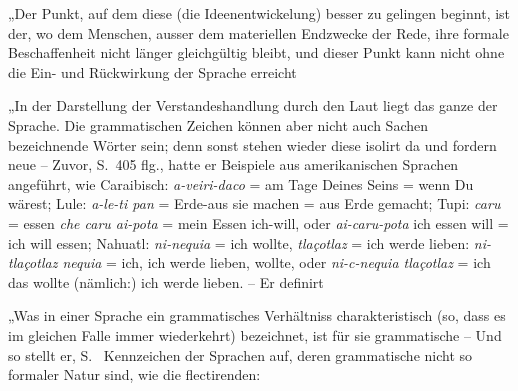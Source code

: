
 „Der Punkt, auf dem diese (die Ideenentwickelung) besser zu gelingen beginnt, ist der, wo dem Menschen, ausser dem materiellen Endzwecke der Rede, ihre formale Beschaffenheit nicht länger gleichgültig bleibt, und dieser Punkt kann nicht ohne die Ein- und Rückwirkung der Sprache erreicht 

 „In der Darstellung der Verstandeshandlung durch den Laut liegt das ganze  der Sprache. Die grammatischen Zeichen können aber nicht auch Sachen bezeichnende Wörter sein; denn sonst stehen wieder diese isolirt da und fordern neue   – Zuvor, S.~405 flg., hatte er Beispiele aus amerikanischen Sprachen angeführt, wie Caraibisch: \textit{a-veiri-daco} = am Tage Deines Seins \label{fp.320} = wenn Du wärest; Lule: \textit{a-le-ti pan} = Erde-aus sie machen = aus Erde gemacht; Tupi: \textit{caru} = essen  \textit{che caru ai-pota} = mein Essen ich-will, oder \textit{ai-caru-pota} \fed{=} ich essen will = ich will essen; Nahuatl: \textit{ni-nequia} = ich wollte, \textit{tlaçotlaz} = ich werde lieben: \textit{ni-tlaçotlaz nequia} = ich, ich werde lieben, wollte, oder \textit{ni-c-nequia tlaçotlaz} = ich das wollte (nämlich:) ich werde lieben. – Er definirt

 „Was in einer Sprache ein grammatisches Verhältniss charakteristisch (so, dass es im gleichen Falle immer wiederkehrt) bezeichnet, ist für sie grammatische  – Und so stellt er, S.~ Kennzeichen der Sprachen auf, deren grammatische  nicht so formaler Natur sind, wie die flectirenden:

